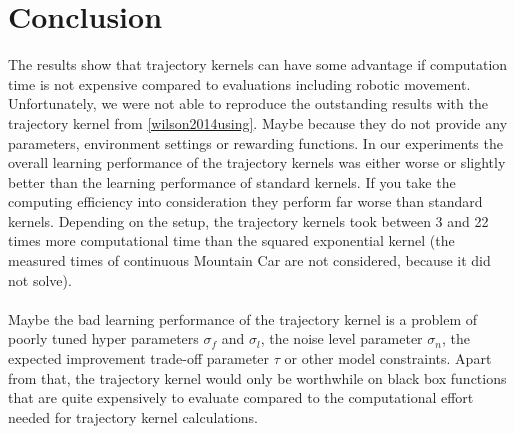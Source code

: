 \section{Conclusion}

The results show that trajectory kernels can have some advantage if computation time is not expensive compared to evaluations including robotic movement.
Unfortunately, we were not able to reproduce the outstanding results with the trajectory kernel from \ref{wilson2014using}. Maybe because they do not provide any parameters, environment settings or rewarding functions. In our experiments the overall learning performance of the trajectory kernels was either worse or slightly better than the learning performance of standard kernels. If you take the computing efficiency into consideration they perform far worse than standard kernels. Depending on the setup, the trajectory kernels took between 3 and 22 times more computational time than the squared exponential kernel (the measured times of continuous Mountain Car are not considered, because it did not solve).\\
\\
Maybe the bad learning performance of the trajectory kernel is a problem of poorly tuned hyper parameters $\sigma_f$ and $\sigma_l$, the noise level parameter $\sigma_n$, the expected improvement trade-off parameter $\tau$ or other model constraints. Apart from that, the trajectory kernel would only be worthwhile on black box functions that are quite expensively to evaluate compared to the computational effort needed for trajectory kernel calculations.
